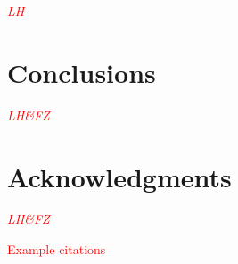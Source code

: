 \documentclass[journal]{new-aiaa}
\begin{document}
\textcolor{red}{\emph{LH}}














\section{Conclusions}

\textcolor{red}{\emph{LH\&FZ}}



\section*{Acknowledgments} %

\textcolor{red}{\emph{LH\&FZ}}


\textcolor{red}{Example citations}

\cite{nakamura1993bluffbody}


\end{document}
